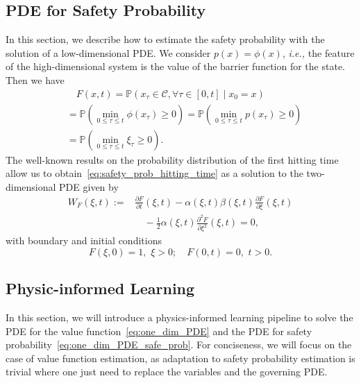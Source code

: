 \documentclass[letterpaper]{article} %
\newcommand{\ie}{\textit{i.e., }}
\newcommand{\pr}{\mathbb{P}}
\newcommand{\safe}{\mathcal{C}}
\begin{document}
\subsection{PDE for Safety Probability}
In this section, we describe how to estimate the safety probability with the solution of a low-dimensional PDE. We consider $p(x) = \phi(x)$, \ie the feature of the high-dimensional system is the value of the barrier function for the state. Then we have
\begin{equation}
\label{eq:safety_prob_hitting_time}
\begin{aligned}
    & \quad F(x,t) = \pr\left(x_\tau \in \safe, \forall \tau\in [0,t] \mid x_0 =x \right) \\
    & = \pr\left(\min_{0\leq \tau \leq t} \phi(x_\tau) \geq 0\right) = \pr\left(\min_{0\leq \tau \leq t} p(x_\tau) \geq 0\right) \\
    & = \pr\left(\min_{0\leq \tau \leq t} \xi_\tau \geq 0\right).
\end{aligned}
\end{equation}
The well-known results on the probability distribution of the first hitting time~\cite{patie2008first} allow us to obtain~\eqref{eq:safety_prob_hitting_time} as a solution to the two-dimensional PDE given by
\begin{equation}
\label{eq:one_dim_PDE_safe_prob}
\begin{aligned}
    W_{F}(\xi,t) := & \frac{\partial F}{\partial t}(\xi, t) - \alpha(\xi, t)\beta(\xi, t)\frac{\partial F}{\partial \xi}(\xi, t) \\
    & \quad - \frac{1}{2} \alpha(\xi, t) \frac{\partial^2 F}{\partial \xi^2}(\xi, t) =0,
\end{aligned}
\end{equation}
with boundary and initial conditions
\begin{equation}\label{eq:safe_PDE_ic_bc}
      F(\xi, 0)  = 1, \,\, \xi > 0; \quad F(0, t)  = 0, \,\, t > 0.
\end{equation}



\subsection{Physic-informed Learning}

In this section, we will introduce a physics-informed learning pipeline to solve the PDE for the value function~\eqref{eq:one_dim_PDE} and the PDE for safety probability~\eqref{eq:one_dim_PDE_safe_prob}. For conciseness, we will focus on the case of value function estimation, as adaptation to safety probability estimation is trivial where one just need to replace the variables and the governing PDE.
\end{document}
